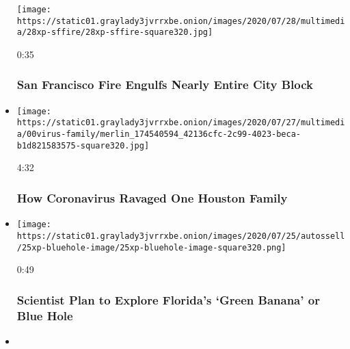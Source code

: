 \begin{itemize}
  \texttt{[image: https://static01.graylady3jvrrxbe.onion/images/2020/07/28/multimedia/28xp-sffire/28xp-sffire-square320.jpg]}

  0:35

  \hypertarget{san-francisco-fire-engulfs-nearly-entire-city-block}{%
  \subsubsection{San Francisco Fire Engulfs Nearly Entire City
  Block}\label{san-francisco-fire-engulfs-nearly-entire-city-block}}
\item
  \href{https://www.nytimes3xbfgragh.onion/video/us/100000007253343/coronavirus-houston-family.html?action=click\&module=video-series-bar\&region=header\&pgtype=Article\&playlistId=video/u-s}{}

  \texttt{[image: https://static01.graylady3jvrrxbe.onion/images/2020/07/27/multimedia/00virus-family/merlin\_174540594\_42136cfc-2c99-4023-beca-b1d821583575-square320.jpg]}

  4:32

  \hypertarget{how-coronavirus-ravaged-one-houston-family}{%
  \subsubsection{How Coronavirus Ravaged One Houston
  Family}\label{how-coronavirus-ravaged-one-houston-family}}
\item
  \href{https://www.nytimes3xbfgragh.onion/video/us/100000007255617/florida-green-banana-bluehole.html?action=click\&module=video-series-bar\&region=header\&pgtype=Article\&playlistId=video/u-s}{}

  \texttt{[image: https://static01.graylady3jvrrxbe.onion/images/2020/07/25/autossell/25xp-bluehole-image/25xp-bluehole-image-square320.png]}

  0:49

  \hypertarget{scientist-plan-to-explore-floridas-green-banana-or-blue-hole}{%
  \subsubsection{Scientist Plan to Explore Florida's `Green Banana' or
  Blue
  Hole}\label{scientist-plan-to-explore-floridas-green-banana-or-blue-hole}}
\item
  \href{https://www.nytimes3xbfgragh.onion/video/us/100000007243995/portland-protests-federal-government.html?action=click\&module=video-series-bar\&region=header\&pgtype=Article\&playlistId=video/u-s}{}


\end{itemize}
